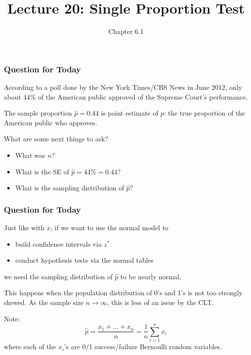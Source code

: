 \documentclass[slides]{beamer}
\title{Lecture 20: Single Proportion Test}
\author{Chapter 6.1}
\date{}
\newcommand{\blue}[1]{\textcolor{blue2}{#1}}
\newcommand{\xbar}{\overline{x}}
\newcommand{\phat}{\widehat{p}}
\begin{document}
\begin{frame}
\titlepage
\end{frame}

\begin{frame}[fragile]
\frametitle{Question for Today}

According to a poll done by the New York Times/CBS News in June 2012, only about 44\% of the American public approved of the Supreme Court's performance.  

\vspace{0.25cm}

\pause The sample proportion $\phat=0.44$ is \blue{point estimate} of $p$: the true proportion of the American public who approves.  

\vspace{0.25cm}

\pause What are some next things to ask?

\vspace{0.25cm}

\pause\begin{itemize}
\item What was $n$?
\item What is the \blue{SE} of $\phat=44\%=0.44$?
\item What is the sampling distribution of $\phat$?
\end{itemize}

\end{frame}


\begin{frame}[fragile]
\frametitle{Question for Today}

Just like with $\xbar$, if we want to use the normal model to
\begin{itemize}
\item build confidence intervals via $z^*$
\item conduct hypothesis tests via the normal tables
\end{itemize}
we need the \blue{sampling distribution} of $\phat$ to be nearly normal.  

\vspace{0.25cm}
\pause This happens when the population distribution of 0's and 1's is not too strongly skewed.  As the sample size $n \longrightarrow \infty$, this is less of an issue by the CLT. 

%
%
\vspace{0.25cm}
\pause Note:  \[
\phat = \frac{x_1 + \ldots + x_n}{n} = \frac{1}{n}\sum_{i=1}^{n}x_i
\]
where each of the $x_i$'s are 0/1 success/failure \blue{Bernoulli} random variables.  
\end{frame}
\end{document}
